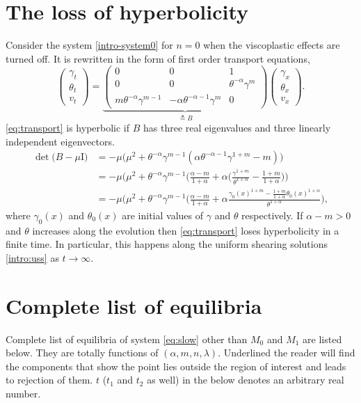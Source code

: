 \documentclass[a4paper,11pt]{article}
\theoremstyle{remark}
\begin{document}
\section{The loss of hyperbolicity} \label{append:hadamard}
Consider the system \eqref{intro-system0} for $n=0$ when the viscoplastic effects are turned off. It is rewritten in the form of  first order transport equations,
\begin{equation} \label{eq:transport}
 \begin{pmatrix} \gamma_t \\ \theta_t \\ v_t \end{pmatrix} = \underbrace{
 \begin{pmatrix}
  0 & 0 & 1\\
  0 & 0 & \theta^{-\alpha}\gamma^m \\
  m\theta^{-\alpha}\gamma^{m-1} & -\alpha\theta^{-\alpha-1}\gamma^m & 0 \end{pmatrix}}_\text{$\triangleq B$}
  \begin{pmatrix} \gamma_x \\ \theta_x \\ v_x \end{pmatrix}.
\end{equation}
\eqref{eq:transport} is hyperbolic if $B$ has three real eigenvalues and three linearly independent eigenvectors.
\begin{align*}
 \det\big(B-\mu\textrm{I}\big) &= -\mu\big(\mu^2+\theta^{-\alpha}\gamma^{m-1}(\alpha \theta^{-\alpha-1}\gamma^{1+m} - m)\big)\\
 &=-\mu\big(\mu^2+\theta^{-\alpha}\gamma^{m-1}\Big(\frac{\alpha-m}{1+\alpha}+\alpha \Big(\frac{\gamma^{1+m}}{\theta^{1+\alpha}} - \frac{1+m}{1+\alpha}\Big)\Big)\\
 &=-\mu\big(\mu^2+\theta^{-\alpha}\gamma^{m-1}\Big(\frac{\alpha-m}{1+\alpha}+\alpha \frac{\gamma_0(x)^{1+m} - \frac{1+m}{1+\alpha}\theta_0(x)^{1+\alpha}}{\theta^{1+\alpha}}\Big),
\end{align*}
where $\gamma_0(x)$ and $\theta_0(x)$ are initial values of $\gamma$ and $\theta$ respectively. If $\alpha-m>0$ and $\theta$ increases
along the evolution then \eqref{eq:transport} loses hyperbolicity in a finite time. In particular, this 
happens along the uniform shearing solutions \eqref{intro:uss}  as $t \rightarrow \infty$.


\section{Complete list of equilibria}\label{append:equi_reject}
Complete list of equilibria of system \eqref{eq:slow} other than $M_0$ and $M_1$ are listed below. They are totally functions of $(\alpha,m,n,\lambda)$. Underlined the reader will find the components that show the point lies outside the region of interest and leads to rejection of them. $t$ ($t_1$ and $t_2$ as well) in the below denotes an arbitrary real number. 
\end{document}

